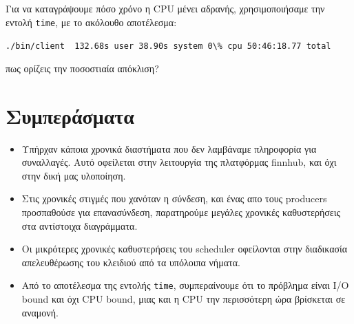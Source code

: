 \documentclass[12pt, a4paper]{article}
\begin{document}
Για να καταγράψουμε πόσο χρόνο η CPU μένει αδρανής, χρησιμοποιήσαμε την εντολή \verb|time|, με το ακόλουθο αποτέλεσμα:

\verb|./bin/client  132.68s user 38.90s system 0\% cpu 50:46:18.77 total|

πως ορίζεις την ποσοστιαία απόκλιση?


\section{Συμπεράσματα}

\begin{itemize}
  \itemsep 0em
  \item Υπήρχαν κάποια χρονικά διαστήματα που δεν λαμβάναμε πληροφορία για συναλλαγές. Αυτό οφείλεται στην λειτουργία της πλατφόρμας finnhub, και όχι στην δική μας υλοποίηση.
  \item Στις χρονικές στιγμές που χανόταν η σύνδεση, και ένας απο τους producers προσπαθούσε για επανασύνδεση, παρατηρούμε μεγάλες χρονικές καθυστερήσεις στα αντίστοιχα διαγράμματα.
  \item Οι μικρότερες χρονικές καθυστερήσεις του scheduler οφείλονται στην διαδικασία απελευθέρωσης του κλειδιού από τα υπόλοιπα νήματα.
  \item Από το αποτέλεσμα της εντολής \verb|time|, συμπεραίνουμε ότι το πρόβλημα είναι I/O bound και όχι CPU bound, μιας και η CPU την περισσότερη ώρα βρίσκεται σε αναμονή.
\end{itemize}
\end{document}
